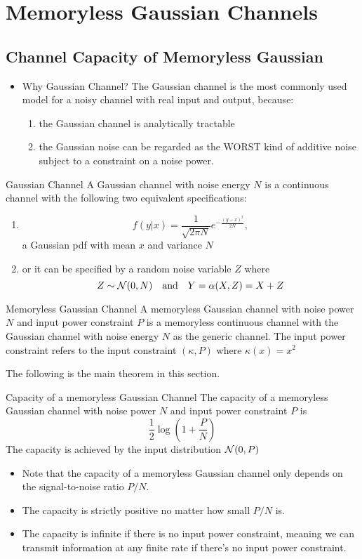 \documentclass[../main.tex]{subfiles}
\begin{document}
\chapter{Memoryless Gaussian Channels}
\section{Channel Capacity of Memoryless Gaussian}
\begin{itemize}
    \item Why Gaussian Channel? The Gaussian channel is the most commonly used model for a noisy channel with real input and output, because: \begin{enumerate}
        \item the Gaussian channel is analytically tractable
        \item the Gaussian noise can be regarded as the WORST kind of additive noise subject to a constraint on a noise power.
    \end{enumerate}
\end{itemize}
\begin{gbox}{Gaussian Channel}
    A Gaussian channel with noise energy $N$ is a continuous channel with the following two equivalent specifications:
    \begin{enumerate}
        \item \[
        f(y|x)=\frac{1}{\sqrt{2\pi N}}e^{-\frac{(y-x)^2}{2N}},
        \] a Gaussian pdf with mean $x$ and variance $N$
        \item or it can be specified by a random noise variable $Z$ where \[
        Z\sim \mathcal{N}(0,N) \quad\text{and}\quad Y=\alpha(X,Z)=X+Z
        \]
    \end{enumerate}
\end{gbox}
\begin{gbox}{Memoryless Gaussian Channel}
    A memoryless Gaussian channel with noise power $N$ and input power constraint $P$ is a memoryless continuous channel with the Gaussian channel with noise energy $N$ as the generic channel. The input power constraint refers to the input constraint $(\kappa, P)$ where $\kappa(x)=x^2$
\end{gbox}
The following is the main theorem in this section.
\begin{bbox}{Capacity of a memoryless Gaussian Channel}
    The capacity of a memoryless Gaussian channel with noise power $N$ and input power constraint $P$ is \[
    \frac{1}{2}\log(1+\frac{P}{N})
    \] 
    The capacity is achieved by the input distribution $\mathcal{N}(0,P)$
    \begin{itemize}
        \item Note that the capacity of a memoryless Gaussian channel only depends on the signal-to-noise ratio $P/N$.
        \item The capacity is strictly positive no matter how small $P/N$ is.
        \item The capacity is infinite if there is no input power constraint, meaning we can transmit information at any finite rate if there's no input power constraint.
    \end{itemize}
\end{bbox}
\end{document}
